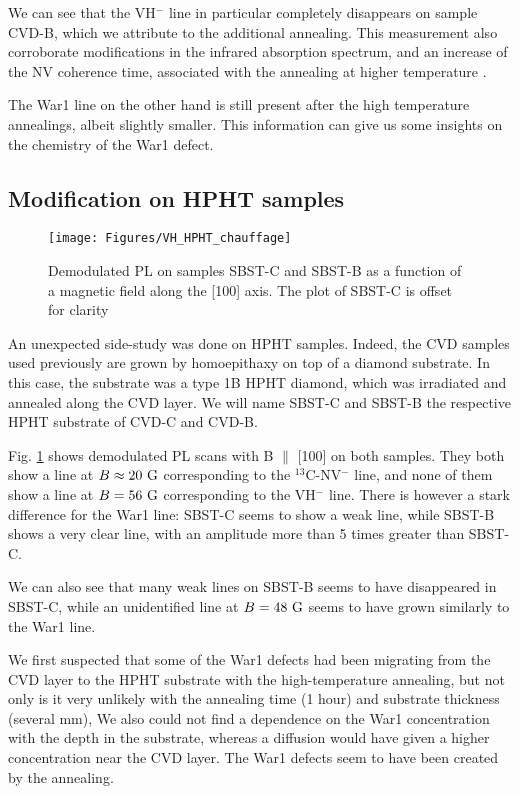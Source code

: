 \documentclass[a4paper,11pt]{report}
\begin{document}
We can see that the VH$^-$ line in particular completely disappears on sample CVD-B, which we attribute to the additional annealing. This measurement also corroborate modifications in the infrared absorption spectrum, and an increase of the NV coherence time, associated with the annealing at higher temperature \citep{ngambou2022improving}.

The War1 line on the other hand is still present after the high temperature annealings, albeit slightly smaller. This information can give us some insights on the chemistry of the War1 defect. %

\subsection{Modification on HPHT samples}

\begin{figure}[h]
\centering
\texttt{[image: Figures/VH\_HPHT\_chauffage]}
\caption{Demodulated PL on samples SBST-C and SBST-B as a function of a magnetic field along the [100] axis. The plot of SBST-C is offset for clarity}
\label{chauffage HPHT}
\end{figure}

An unexpected side-study was done on HPHT samples. Indeed, the CVD samples used previously are grown by homoepithaxy on top of a diamond substrate. In this case, the substrate was a type 1B HPHT diamond, which was irradiated and annealed along the CVD layer. We will name SBST-C and SBST-B the respective HPHT substrate of CVD-C and CVD-B.

Fig. \ref{chauffage HPHT} shows demodulated PL scans with B $\parallel$ [100] on both samples. They both show a line at $B \approx 20\ \rm G$ corresponding to the $^{13}$C-NV$^-$ line, and none of them show a line at $B = 56\ \rm G$ corresponding to the VH$^-$ line. There is however a stark difference for the War1 line: SBST-C seems to show a weak line, while SBST-B shows a very clear line, with an amplitude more than 5 times greater than SBST-C. 

We can also see that many weak lines on SBST-B seems to have disappeared in SBST-C, while an unidentified line at $B = 48\ \rm G$ seems to have grown similarly to the War1 line.

We first suspected that some of the War1 defects had been migrating from the CVD layer to the HPHT substrate with the high-temperature annealing, but not only is it very unlikely with the annealing time (1 hour) and substrate thickness (several mm), We also could not find a dependence on the War1 concentration with the depth in the substrate, whereas a diffusion would have given a higher concentration near the CVD layer. The War1 defects seem to have been created by the annealing.
\end{document}
